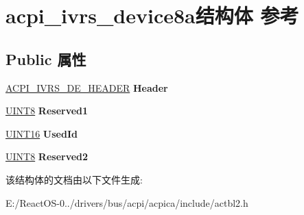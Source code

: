 \hypertarget{structacpi__ivrs__device8a}{}\section{acpi\+\_\+ivrs\+\_\+device8a结构体 参考}
\label{structacpi__ivrs__device8a}
\subsection*{Public 属性}
\begin{DoxyCompactItemize}
\item 
\mbox{\label{structacpi__ivrs__device8a_a2f91c24e9e9b7d402558caf53f99a104}} 
\hyperlink{structacpi__ivrs__de__header}{A\+C\+P\+I\+\_\+\+I\+V\+R\+S\+\_\+\+D\+E\+\_\+\+H\+E\+A\+D\+ER} {\bfseries Header}
\item 
\mbox{\label{structacpi__ivrs__device8a_adcb07c8915d961544399b77fb20530e2}} 
\hyperlink{_processor_bind_8h_ab27e9918b538ce9d8ca692479b375b6a}{U\+I\+N\+T8} {\bfseries Reserved1}
\item 
\mbox{\label{structacpi__ivrs__device8a_a0bdd8702046077085943c47e5dff5975}} 
\hyperlink{_processor_bind_8h_a09f1a1fb2293e33483cc8d44aefb1eb1}{U\+I\+N\+T16} {\bfseries Used\+Id}
\item 
\mbox{\label{structacpi__ivrs__device8a_a0d994d6f89b249cc11452949a04c2ebd}} 
\hyperlink{_processor_bind_8h_ab27e9918b538ce9d8ca692479b375b6a}{U\+I\+N\+T8} {\bfseries Reserved2}
\end{DoxyCompactItemize}


该结构体的文档由以下文件生成\+:\begin{DoxyCompactItemize}
\item 
E\+:/\+React\+O\+S-\/0../drivers/bus/acpi/acpica/include/actbl2.\+h\end{DoxyCompactItemize}
